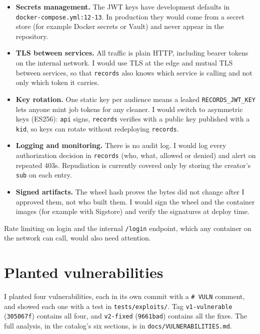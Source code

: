 \documentclass[11pt,a4paper]{article}
\newcommand{\file}[1]{\nolinkurl{#1}}
\newcommand{\commit}[1]{\texttt{#1}}
\begin{document}
\begin{itemize}
  \item \textbf{Secrets management.} The JWT keys have development defaults in \file{docker-compose.yml:12-13}. In production they would come from a secret store (for example Docker secrets or Vault) and never appear in the repository.
  \item \textbf{TLS between services.} All traffic is plain HTTP, including bearer tokens on the internal network. I would use TLS at the edge and mutual TLS between services, so that \texttt{records} also knows which service is calling and not only which token it carries.
  \item \textbf{Key rotation.} One static key per audience means a leaked \texttt{RECORDS\_JWT\_KEY} lets anyone mint job tokens for any cleaner. I would switch to asymmetric keys (ES256): \texttt{api} signs, \texttt{records} verifies with a public key published with a \texttt{kid}, so keys can rotate without redeploying \texttt{records}.
  \item \textbf{Logging and monitoring.} There is no audit log. I would log every authorization decision in \texttt{records} (who, what, allowed or denied) and alert on repeated 403s. Repudiation is currently covered only by storing the creator's \texttt{sub} on each entry.
  \item \textbf{Signed artifacts.} The wheel hash proves the bytes did not change after I approved them, not who built them. I would sign the wheel and the container images (for example with Sigstore) and verify the signatures at deploy time.
\end{itemize}

Rate limiting on login and the internal \texttt{/login} endpoint, which any container on the network can call, would also need attention.

\section{Planted vulnerabilities}

I planted four vulnerabilities, each in its own commit with a \texttt{\# VULN} comment, and showed each one with a test in \file{tests/exploits/}. Tag \texttt{v1-vulnerable} (\commit{305067f}) contains all four, and \texttt{v2-fixed} (\commit{9661bad}) contains all the fixes. The full analysis, in the catalog's six sections, is in \file{docs/VULNERABILITIES.md}.
\end{document}
